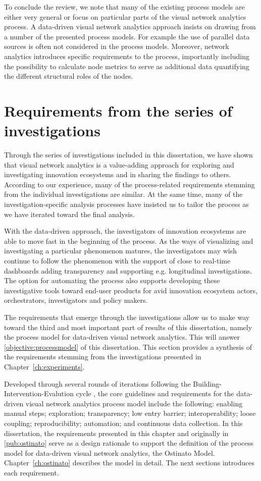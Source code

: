 To conclude the review, we note that many of the existing process models are either very general or focus on particular parts of the visual network analytics process. A data-driven visual network analytics approach insists on drawing from a number of the presented process models. For example the use of parallel data sources is often not considered in the process models. Moreover, network analytics introduces specific requirements to the process, importantly including the possibility to calculate node metrics to serve as additional data quantifying the different structural roles of the nodes.

\section{Requirements from the series of investigations}
\label{sec:processmodelrequirements}

Through the series of investigations included in this dissertation, we have shown that visual network analytics is a value-adding approach for exploring and investigating innovation ecosystems and in sharing the findings to others. According to our experience, many of the process-related requirements stemming from the individual investigations are similar. At the same time, many of the investigation-specific analysis processes have insisted us to tailor the process as we have iterated toward the final analysis.

With the data-driven approach, the investigators of innovation ecosystems are able to move fast in the beginning of the process. As the ways of visualizing and investigating a particular phenomenon matures, the investigators may wish continue to follow the phenomenon with the support of close to real-time dashboards adding transparency and supporting e.g. longitudinal investigations. The option for automating the process also supports developing these investigative tools toward end-user products for avid innovation ecosystem actors, orchestrators, investigators and policy makers.

The requirements that emerge through the investigations allow us to make way toward the third and most important part of results of this dissertation, namely the process model for data-driven visual network analytics. This will answer \ref{objective:processmodel} of this dissertation. This section provides a synthesis of the requirements stemming from the investigations presented in Chapter~\ref{ch:experiments}.

Developed through several rounds of iterations following the Building-Intervention-Evalution cycle \citep{Sein2011ActionResearch}, the core guidelines and requirements for the data-driven visual network analytics process model include the following: enabling manual steps; exploration; transparency; low entry barrier; interoperability; loose coupling; reproducibility; automation;   and continuous data collection. In this dissertation, the requirements presented in this chapter and originally in \ref{pub:ostinato} serve as a design rationale to support the definition of the process model for data-driven visual network analytics, the Ostinato Model. Chapter~\ref{ch:ostinato} describes the model in detail. The next sections introduces each requirement.

